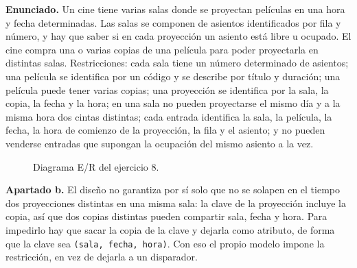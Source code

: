 \textbf{Enunciado.} Un cine tiene varias salas donde se proyectan películas en
una hora y fecha determinadas. Las salas se componen de asientos identificados
por fila y número, y hay que saber si en cada proyección un asiento está libre u
ocupado. El cine compra una o varias copias de una película para poder
proyectarla en distintas salas. Restricciones: cada sala tiene un número
determinado de asientos; una película se identifica por un código y se describe
por título y duración; una película puede tener varias copias; una proyección se
identifica por la sala, la copia, la fecha y la hora; en una sala no pueden
proyectarse el mismo día y a la misma hora dos cintas distintas; cada entrada
identifica la sala, la película, la fecha, la hora de comienzo de la proyección,
la fila y el asiento; y no pueden venderse entradas que supongan la ocupación
del mismo asiento a la vez.

\begin{figure}[H]
\centering
{}
\caption{Diagrama E/R del ejercicio 8.}
\end{figure}

\textbf{Apartado b.} El diseño no garantiza por sí solo que no se solapen en el
tiempo dos proyecciones distintas en una misma sala: la clave de la proyección
incluye la copia, así que dos copias distintas pueden compartir sala, fecha y
hora. Para impedirlo hay que sacar la copia de la clave y dejarla como atributo,
de forma que la clave sea \texttt{(sala, fecha, hora)}. Con eso el propio modelo
impone la restricción, en vez de dejarla a un disparador.

